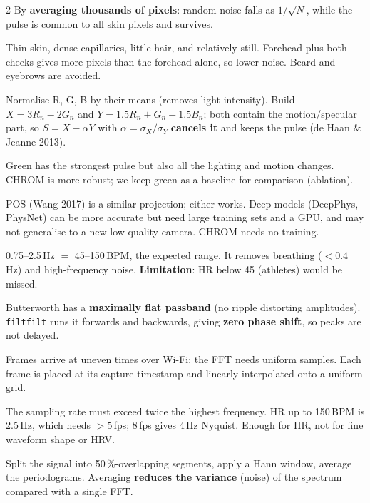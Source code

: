 \begin{multicols}{2}
{By \textbf{averaging thousands of pixels}: random noise falls as $1/\sqrt{N}$, while the pulse is common to all skin pixels and
survives.}

{Thin skin, dense capillaries, little hair, and relatively still. Forehead plus both cheeks gives more pixels than the forehead
alone, so lower noise. Beard and eyebrows are avoided.}

{Normalise R, G, B by their means (removes light intensity). Build $X=3R_n-2G_n$ and $Y=1.5R_n+G_n-1.5B_n$; both contain the
motion/specular part, so $S=X-\alpha Y$ with $\alpha=\sigma_X/\sigma_Y$ \textbf{cancels it} and keeps the pulse (de Haan \& Jeanne
2013).}

{Green has the strongest pulse but also all the lighting and motion changes. CHROM is more robust; we keep green as a baseline
for comparison (ablation).}

{POS (Wang 2017) is a similar projection; either works. Deep models (DeepPhys, PhysNet) can be more accurate but need large
training sets and a GPU, and may not generalise to a new low-quality camera. CHROM needs no training.}

{0.75--2.5\,Hz $=$ 45--150\,BPM, the expected range. It removes breathing ($<0.4$\,Hz) and high-frequency noise.
\textbf{Limitation}: HR below 45 (athletes) would be missed.}

{Butterworth has a \textbf{maximally flat passband} (no ripple distorting amplitudes). \texttt{filtfilt} runs it forwards and
backwards, giving \textbf{zero phase shift}, so peaks are not delayed.}

{Frames arrive at uneven times over Wi-Fi; the FFT needs uniform samples. Each frame is placed at its capture timestamp and
linearly interpolated onto a uniform grid.}

{The sampling rate must exceed twice the highest frequency. HR up to 150\,BPM is 2.5\,Hz, which needs $>5$\,fps; 8\,fps gives
4\,Hz Nyquist. Enough for HR, not for fine waveform shape or HRV.}

{Split the signal into 50\,\%-overlapping segments, apply a Hann window, average the periodograms. Averaging \textbf{reduces
the variance} (noise) of the spectrum compared with a single FFT.}


\end{multicols}
